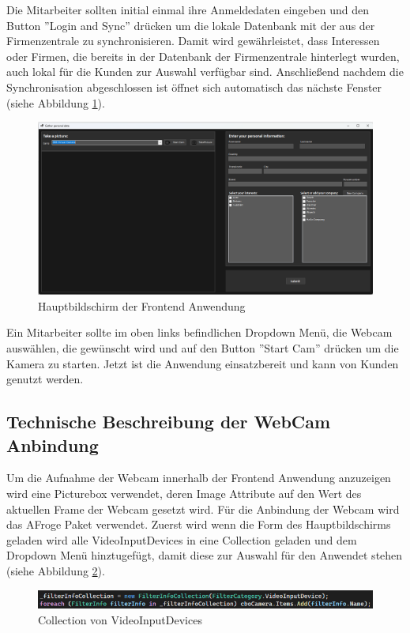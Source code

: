 Die Mitarbeiter sollten initial einmal ihre Anmeldedaten eingeben und den Button ''Login and Sync'' drücken um die lokale Datenbank mit der aus der Firmenzentrale zu synchronisieren. Damit wird gewährleistet, dass Interessen oder Firmen, die bereits in der Datenbank der Firmenzentrale hinterlegt wurden, auch lokal für die Kunden zur Auswahl verfügbar sind. Anschließend nachdem die Synchronisation abgeschlossen ist öffnet sich automatisch das nächste Fenster (siehe Abbildung \ref{fig:projektmessemainscreen}).

\begin{figure}[h]
	\centering
	\includegraphics[width=0.9\linewidth]{Images/Hauptbildschirm}
	\caption{Hauptbildschirm der Frontend Anwendung}
	\label{fig:projektmessemainscreen}
\end{figure}

Ein Mitarbeiter sollte im oben links befindlichen Dropdown Menü, die Webcam auswählen, die gewünscht wird und auf den Button ''Start Cam'' drücken um die Kamera zu starten. Jetzt ist die Anwendung einsatzbereit und kann von Kunden genutzt werden.
\newpage
\subsection{Technische Beschreibung der WebCam Anbindung}
Um die Aufnahme der Webcam innerhalb der Frontend Anwendung anzuzeigen wird eine Picturebox verwendet, deren Image Attribute auf den Wert des aktuellen Frame der Webcam gesetzt wird. 
Für die Anbindung der Webcam wird das AFroge Paket verwendet. Zuerst wird wenn die Form des Hauptbildschirms geladen wird alle VideoInputDevices in eine Collection geladen und dem Dropdown Menü hinztugefügt, damit diese zur Auswahl für den Anwendet stehen (siehe Abbildung \ref{fig:projektmessewebcam1}).

\begin{figure}[h]
	\centering
	\includegraphics[width=0.9\linewidth]{Images/Projekt_Messe_Webcam1}
	\caption{Collection von VideoInputDevices}
	\label{fig:projektmessewebcam1}
\end{figure}

